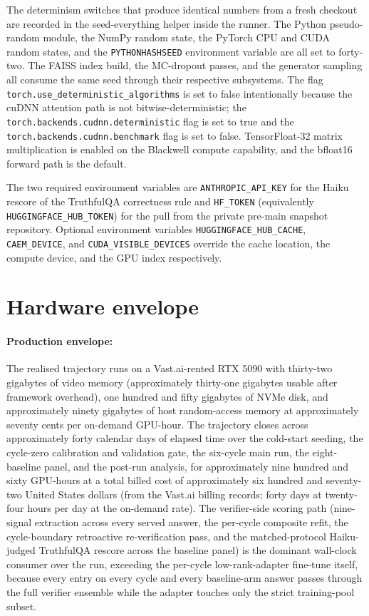 The determinism switches that produce identical numbers from a fresh checkout are recorded in the seed-everything helper inside the runner. The Python pseudo-random module, the NumPy random state, the PyTorch CPU and CUDA random states, and the \verb|PYTHONHASHSEED| environment variable are all set to forty-two. The FAISS index build, the MC-dropout passes, and the generator sampling all consume the same seed through their respective subsystems. The flag \verb|torch.use_deterministic_algorithms| is set to false intentionally because the cuDNN attention path is not bitwise-deterministic; the \verb|torch.backends.cudnn.deterministic| flag is set to true and the \verb|torch.backends.cudnn.benchmark| flag is set to false. TensorFloat-32 matrix multiplication is enabled on the Blackwell compute capability, and the bfloat16 forward path is the default.

The two required environment variables are \verb|ANTHROPIC_API_KEY| for the Haiku rescore of the TruthfulQA correctness rule and \verb|HF_TOKEN| (equivalently \verb|HUGGINGFACE_HUB_TOKEN|) for the pull from the private pre-main snapshot repository. Optional environment variables \verb|HUGGINGFACE_HUB_CACHE|, \verb|CAEM_DEVICE|, and \verb|CUDA_VISIBLE_DEVICES| override the cache location, the compute device, and the GPU index respectively.

\section{Hardware envelope}
\label{app:repro-hardware}

\paragraph{Production envelope:} The realised trajectory runs on a Vast.ai-rented RTX 5090 with thirty-two gigabytes of video memory (approximately thirty-one gigabytes usable after framework overhead), one hundred and fifty gigabytes of NVMe disk, and approximately ninety gigabytes of host random-access memory at approximately seventy cents per on-demand GPU-hour. The trajectory closes across approximately forty calendar days of elapsed time over the cold-start seeding, the cycle-zero calibration and validation gate, the six-cycle main run, the eight-baseline panel, and the post-run analysis, for approximately nine hundred and sixty GPU-hours at a total billed cost of approximately six hundred and seventy-two United States dollars (from the Vast.ai billing records; forty days at twenty-four hours per day at the on-demand rate). The verifier-side scoring path (nine-signal extraction across every served answer, the per-cycle composite refit, the cycle-boundary retroactive re-verification pass, and the matched-protocol Haiku-judged TruthfulQA rescore across the baseline panel) is the dominant wall-clock consumer over the run, exceeding the per-cycle low-rank-adapter fine-tune itself, because every entry on every cycle and every baseline-arm answer passes through the full verifier ensemble while the adapter touches only the strict training-pool subset.

